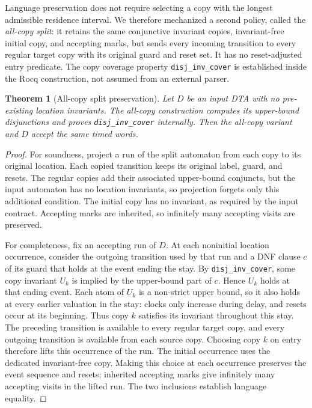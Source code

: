 \documentclass{ieeeaccess}
\newtheorem{theorem}{Theorem}[section]
\begin{document}
Language preservation does not require selecting a copy with the longest
admissible residence interval. We therefore mechanized a second policy,
called the \emph{all-copy split}: it retains the same conjunctive invariant
copies, invariant-free initial copy, and accepting marks, but sends every
incoming transition to every regular target copy with its original guard and
reset set. It has no reset-adjusted entry predicate. The copy coverage
property \texttt{disj\_inv\_cover} is established inside the Rocq
construction, not assumed from an external parser.

\begin{theorem}[All-copy split preservation]
Let $D$ be an input DTA with no pre-existing location invariants. The
all-copy construction computes its upper-bound disjunctions and proves
\texttt{disj\_inv\_cover} internally. Then the all-copy variant and $D$
accept the same timed words.
\end{theorem}
\begin{proof}
For soundness, project a run of the split automaton from each copy to its
original location. Each copied transition keeps its original label, guard,
and resets. The regular copies add their associated upper-bound conjuncts,
but the input automaton has no location invariants, so projection forgets
only this additional condition. The initial copy has no invariant, as required
by the input contract. Accepting marks are inherited, so infinitely many
accepting visits are preserved.

For completeness, fix an accepting run of $D$. At each noninitial location
occurrence, consider the outgoing transition used by that run and a DNF
clause $c$ of its guard that holds at the event ending the stay. By
\texttt{disj\_inv\_cover}, some copy invariant $U_k$ is implied by the
upper-bound part of $c$. Hence $U_k$ holds at that ending event. Each atom
of $U_k$ is a non-strict upper bound, so it also holds at every earlier
valuation in the stay: clocks only increase during delay, and resets occur
at its beginning. Thus copy $k$ satisfies its invariant throughout this
stay. The preceding transition is available to every regular target copy,
and every outgoing transition is available from each source copy. Choosing
copy $k$ on entry therefore lifts this occurrence of the run. The initial
occurrence uses the dedicated invariant-free copy. Making this choice at
each occurrence preserves the event sequence and resets; inherited
accepting marks give infinitely many accepting visits in the lifted run.
The two inclusions establish language equality.
\end{proof}
\end{document}
